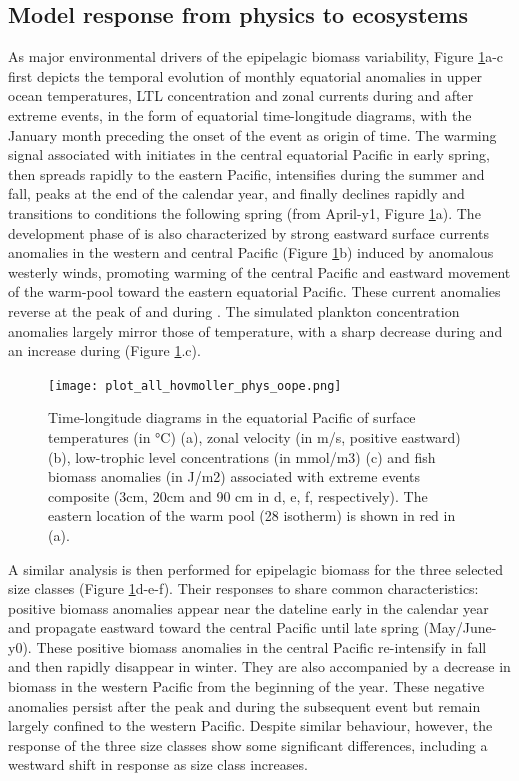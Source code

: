 \subsection{Model response from physics to ecosystems}

As major environmental drivers of the epipelagic biomass variability, Figure \ref{fig:hov_nemo_ape}a-c first depicts the temporal evolution of monthly equatorial anomalies in upper ocean temperatures, LTL concentration and zonal currents during and after extreme \nino{} events, in the form of equatorial time-longitude diagrams, with the January month preceding the onset of the \nino{} event as origin of time. The warming signal associated with \nino{} initiates in the central equatorial Pacific in early spring, then spreads rapidly to the eastern Pacific, intensifies during the summer and fall, peaks at the end of the calendar year, and finally  declines rapidly and transitions to \nina{} conditions the following spring (from April-y1, Figure \ref{fig:hov_nemo_ape}a). The development phase of \nino{} is also characterized by strong eastward surface currents anomalies in the western and central Pacific (Figure \ref{fig:hov_nemo_ape}b) induced by anomalous westerly winds, promoting warming of the central Pacific and eastward movement of the warm-pool toward the eastern equatorial Pacific. These current anomalies reverse at the peak of \nino{} and during \nina{}. The simulated plankton concentration anomalies largely mirror those of temperature, with a sharp decrease during \nino{} and an increase during \nina{} (Figure \ref{fig:hov_nemo_ape}.c). 

\begin{figure}[h!tp]
	\centering
	\texttt{[image: plot\_all\_hovmoller\_phys\_oope.png]}	
	\caption{Time-longitude diagrams in the equatorial Pacific of surface temperatures (in °C) (a), zonal velocity (in m/s, positive eastward) (b), low-trophic level concentrations (in mmol/m3) (c) and fish biomass anomalies (in J/m2) associated with extreme \nino{} events composite (3cm, 20cm and 90 cm in d, e, f, respectively). The eastern location of the warm pool (28\degree{} isotherm) is shown in red in (a).}	
	\label{fig:hov_nemo_ape}
\end{figure}

A similar analysis is then performed for epipelagic biomass for the three selected size classes (Figure \ref{fig:hov_nemo_ape}d-e-f). Their responses to \nino{} share common characteristics: positive biomass anomalies appear near the dateline early in the calendar year and propagate eastward toward the central Pacific until late spring (May/June-y0). These positive biomass anomalies in the central Pacific re-intensify in fall and then rapidly disappear in winter. They are also accompanied by a decrease in biomass in the western Pacific from the beginning of the \nino{} year. These negative anomalies persist after the \nino{} peak and during the subsequent \nina{} event but remain largely confined to the western Pacific. Despite similar behaviour, however, the response of the three size classes show some significant differences, including a westward shift in response as size class increases.


